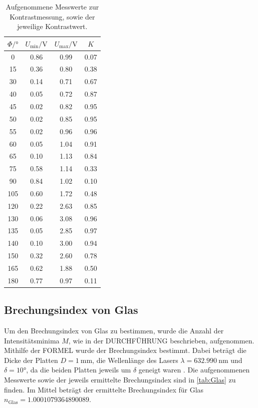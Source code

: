 \begin{table}[h]
  \centering
  \caption{Aufgenommene Messwerte zur Kontrastmessung, sowie der jeweilige Kontrastwert.}
  \label{tab:Kontrast}
  \begin{tabular}{c c c c}
    \toprule
    $\Phi / ° $ & $U_{\text{min}} / \si{\volt}$ & $U_{\text{max}} / \si{\volt}$ & $K$ \\
    \midrule
    0     &  0.86  &  0.99  & 0.07  \\
    15    &  0.36  &  0.80  & 0.38  \\
    30    &  0.14  &  0.71  & 0.67  \\
    40    &  0.05  &  0.72  & 0.87  \\
    45    &  0.02  &  0.82  & 0.95  \\
    50    &  0.02  &  0.85  & 0.95  \\
    55    &  0.02  &  0.96  & 0.96  \\
    60    &  0.05  &  1.04  & 0.91  \\
    65    &  0.10  &  1.13  & 0.84  \\
    75    &  0.58  &  1.14  & 0.33  \\
    90    &  0.84  &  1.02  & 0.10  \\
    105   &  0.60  &  1.72  & 0.48  \\
    120   &  0.22  &  2.63  & 0.85  \\
    130   &  0.06  &  3.08  & 0.96  \\
    135   &  0.05  &  2.85  & 0.97  \\
    140   &  0.10  &  3.00  & 0.94  \\
    150   &  0.32  &  2.60  & 0.78  \\
    165   &  0.62  &  1.88  & 0.50  \\
    180   &  0.77  &  0.97  & 0.11  \\
    \bottomrule
  \end{tabular}
\end{table}

\subsection{Brechungsindex von Glas}
\label{subsec:n_Glas}
Um den Brechungsindex von Glas zu bestimmen, wurde die Anzahl der Intensitätsminima $M$, wie in der DURCHFÜHRUNG beschrieben, aufgenommen.
Mithilfe der FORMEL wurde der Brechungsindex bestimmt.
Dabei beträgt die Dicke der Platten $D = \SI{1}{\milli\metre}$, die Wellenlänge des Lasers $\lambda = \SI{632.990}{\nano\metre}$ und $\delta = 10°$, da die beiden Platten jeweils um $\delta$ geneigt waren \cite{anleitung}.
Die aufgenommenen Messwerte sowie der jeweils ermittelte Brechungsindex sind in \autoref{tab:Glas} zu finden.
Im Mittel beträgt der ermittelte Brechungsindex für Glas $n_\text{Glas} = 1.0001079364890089$.


